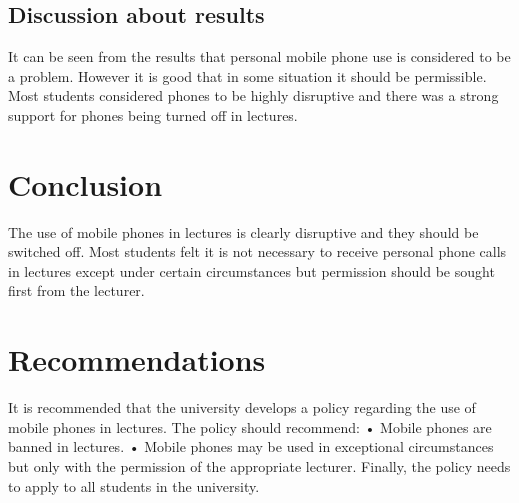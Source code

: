 \documentclass[14pt]{article}
\begin{document}
\subsection{Discussion about results}

It can be seen from the results that personal mobile phone use is considered to be a problem. However it is good that in some situation it should be permissible. Most students considered phones to be highly disruptive and there was a strong support for phones being turned off in lectures.

\section{Conclusion}
The use of mobile phones in lectures is clearly disruptive and they should be switched off. Most students felt it is not necessary to receive personal phone calls in lectures except under certain circumstances but permission should be sought first from the lecturer.

\section{Recommendations}

It is recommended that the university develops a policy regarding the use of mobile phones in lectures. The policy should recommend:
•	Mobile phones are banned in lectures.
•	Mobile phones may be used in exceptional circumstances but only with the permission of the appropriate lecturer.
Finally, the policy needs to apply to all students in the university.
 
\end{document}
